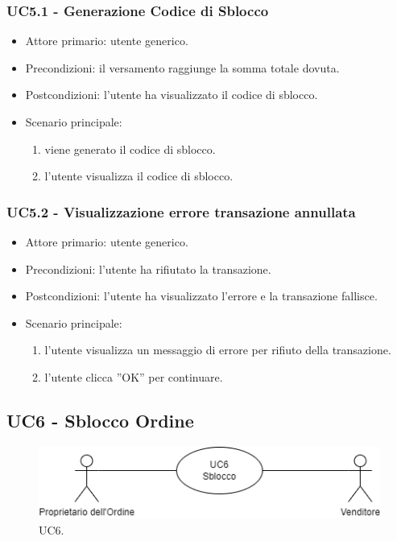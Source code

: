 \subsubsection{UC5.1 - Generazione Codice di Sblocco}

\begin{itemize}
    \item Attore primario: utente generico.
    \item Precondizioni: il versamento raggiunge la somma totale dovuta.
    \item Postcondizioni: l'utente ha visualizzato il codice di sblocco.
    \item Scenario principale: \begin{enumerate}
        \item viene generato il codice di sblocco.
        \item l'utente visualizza il codice di sblocco.
    \end{enumerate}
\end{itemize}

\subsubsection{UC5.2 - Visualizzazione errore transazione annullata}

\begin{itemize}
    \item Attore primario: utente generico.
    \item Precondizioni: l'utente ha rifiutato la transazione.
    \item Postcondizioni: l'utente ha visualizzato l'errore e la transazione fallisce.
    \item Scenario principale: \begin{enumerate}
        \item l'utente visualizza un messaggio di errore per rifiuto della transazione.
        \item l’utente clicca ”OK” per continuare.
    \end{enumerate}
\end{itemize}

\subsection{UC6 - Sblocco Ordine}

\begin{figure}[H]
    \centering
    \includegraphics[scale=0.7]{immagini/UseCases-UC6.png}
    \caption{UC6.}
  \end{figure}

